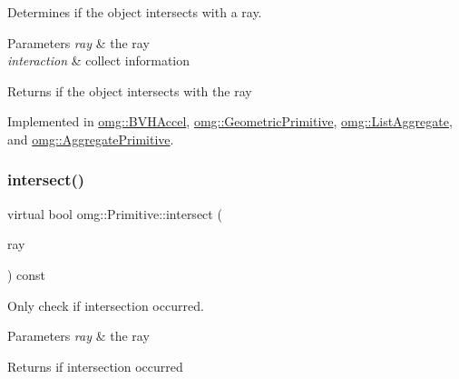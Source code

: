 Determines if the object intersects with a ray. 


\begin{DoxyParams}{Parameters}
{\em ray} & the ray \\
\hline
{\em interaction} & collect information \\
\hline
\end{DoxyParams}
\begin{DoxyReturn}{Returns}
if the object intersects with the ray 
\end{DoxyReturn}


Implemented in \mbox{\hyperlink{classomg_1_1_b_v_h_accel_a368b5156d04fdac833f8c9917f13d91e}{omg\+::\+B\+V\+H\+Accel}}, \mbox{\hyperlink{classomg_1_1_geometric_primitive_a21bc48f971cbc94b60791906f20bc925}{omg\+::\+Geometric\+Primitive}}, \mbox{\hyperlink{classomg_1_1_list_aggregate_a55fdd3b0fa387cb14488b86634b3e877}{omg\+::\+List\+Aggregate}}, and \mbox{\hyperlink{classomg_1_1_aggregate_primitive_a07ab041d9071295e4f648475c7163470}{omg\+::\+Aggregate\+Primitive}}.

\mbox{\label{classomg_1_1_primitive_a139c012a57ad2322c5bef078b5d7e653}} 
\subsubsection{\texorpdfstring{intersect()}{intersect()}\hspace{0.1cm}{\footnotesize\ttfamily [2/2]}}
{\footnotesize\ttfamily virtual bool omg\+::\+Primitive\+::intersect (\begin{DoxyParamCaption}\item[{const \mbox{\hyperlink{classomg_1_1_ray}{Ray}} \&}]{ray }\end{DoxyParamCaption}) const\hspace{0.3cm}{\ttfamily [pure virtual]}}



Only check if intersection occurred. 


\begin{DoxyParams}{Parameters}
{\em ray} & the ray \\
\hline
\end{DoxyParams}
\begin{DoxyReturn}{Returns}
if intersection occurred 
\end{DoxyReturn}


